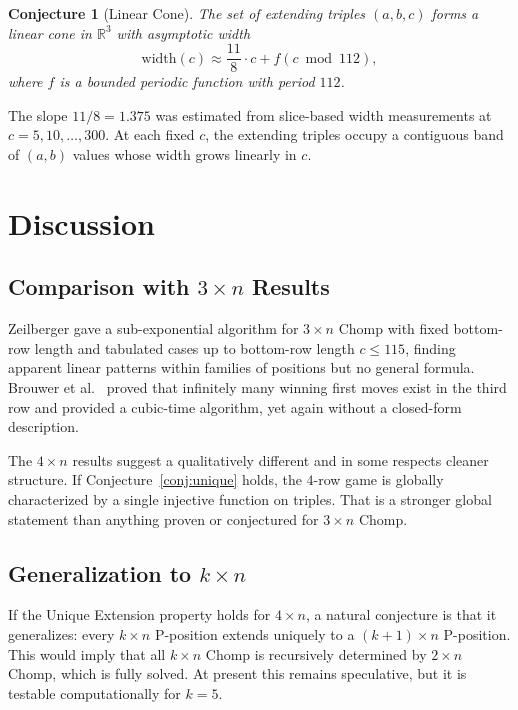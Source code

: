 \documentclass[12pt]{article}
\newtheorem{conjecture}{Conjecture}
\begin{document}
\begin{conjecture}[Linear Cone]
\label{conj:cone}
The set of extending triples $(a,b,c)$ forms a linear cone in
$\mathbb{R}^3$ with asymptotic width
\[
\mathrm{width}(c) \approx \frac{11}{8} \cdot c + f(c \bmod 112),
\]
where $f$ is a bounded periodic function with period $112$.
\end{conjecture}

The slope $11/8 = 1.375$ was estimated from slice-based width measurements
at $c = 5, 10, \ldots, 300$. At each fixed $c$, the extending triples
occupy a contiguous band of $(a,b)$ values whose width grows linearly in $c$.

\section{Discussion}

\subsection{Comparison with \texorpdfstring{$3 \times n$}{3xn} Results}

Zeilberger \cite{zeilberger2001} gave a sub-exponential algorithm for
$3 \times n$ Chomp with fixed bottom-row length and tabulated cases up
to bottom-row length $c \leq 115$, finding apparent linear patterns
within families of positions but no general formula. Brouwer et al.\
\cite{brouwer2005} proved that infinitely many winning first moves exist
in the third row and provided a cubic-time algorithm, yet again without
a closed-form description.

The $4 \times n$ results suggest a qualitatively different and in some
respects cleaner structure. If Conjecture~\ref{conj:unique} holds, the
$4$-row game is globally characterized by a single injective function on
triples. That is a stronger global statement than anything proven or
conjectured for $3 \times n$ Chomp.

\subsection{Generalization to \texorpdfstring{$k \times n$}{kxn}}

If the Unique Extension property holds for $4 \times n$, a natural
conjecture is that it generalizes: every $k \times n$ P-position extends
uniquely to a $(k+1) \times n$ P-position. This would imply that all
$k \times n$ Chomp is recursively determined by $2 \times n$ Chomp, which
is fully solved. At present this remains speculative, but it is testable
computationally for $k = 5$.
\end{document}
